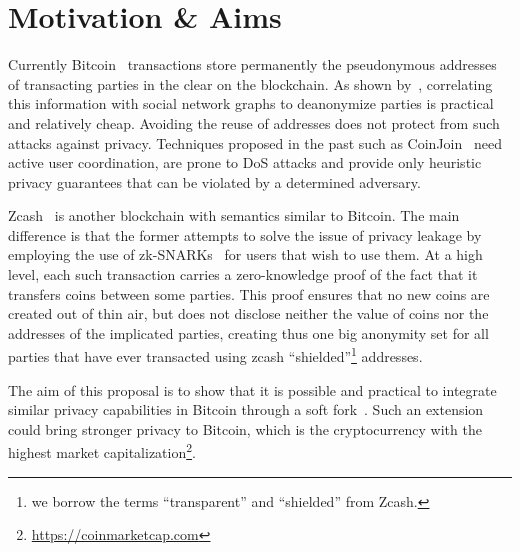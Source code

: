 \section{Motivation \& Aims}
  Currently Bitcoin~\cite{bitcoin} transactions store permanently the
  pseudonymous addresses of transacting parties in the clear on the blockchain.
  As shown by~\cite{DBLP:conf/fc/AndroulakiKRSC13}, correlating this
  information with social network graphs to deanonymize parties is practical and
  relatively cheap.  Avoiding the reuse of addresses does not protect from such
  attacks against privacy.  Techniques proposed in the past such as
  CoinJoin~\cite{DBLP:conf/trustcom/MaurerNF17} need active user coordination,
  are prone to DoS attacks and provide only heuristic privacy guarantees that
  can be violated by a determined adversary.

  Zcash~\cite{DBLP:conf/sp/Ben-SassonCG0MTV14,zcash-protocol} is another
  blockchain with semantics similar to Bitcoin. The main difference is that the
  former attempts to solve the issue of privacy leakage by employing the use of
  zk-SNARKs~\cite{DBLP:conf/stoc/BitanskyCCT13,DBLP:conf/eurocrypt/Groth16} for
  users that wish to use them. At a high level, each such transaction carries a
  zero-knowledge proof of the fact that it transfers coins between some parties.
  This proof ensures that no new coins are created out of thin air, but does not
  disclose neither the value of coins nor the addresses of the implicated
  parties, creating thus one big anonymity set for all parties that have ever
  transacted using zcash ``shielded''\footnote{we borrow the terms
  ``transparent'' and ``shielded'' from Zcash.} addresses.

  The aim of this proposal is to show that it is possible and practical to
  integrate similar privacy capabilities in Bitcoin through a soft
  fork~\cite{DBLP:conf/fc/ZamyatinSJSWK18}. Such an extension could bring
  stronger privacy to Bitcoin, which is the cryptocurrency with the highest
  market capitalization\footnote{\url{https://coinmarketcap.com}}.
